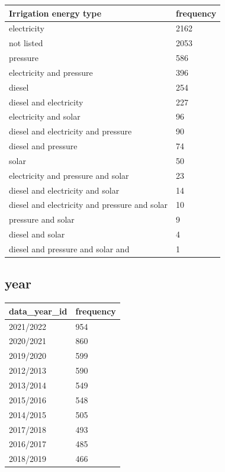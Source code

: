 \documentclass[review,12pt,authoryear]{elsarticle}
\begin{document}
\begin{linenumbers}
\begin{table}[]
  \begin{tabular}{@{}ll@{}}
  \toprule
  Irrigation energy type & frequency \\ \midrule
  electricity & 2162 \\
  not listed & 2053 \\
  pressure & 586 \\
  electricity and pressure & 396 \\
  diesel & 254 \\
  diesel and electricity & 227 \\
  electricity and solar & 96 \\
  diesel and electricity and pressure & 90 \\
  diesel and pressure & 74 \\
  solar & 50 \\
  electricity and pressure and solar & 23 \\
  diesel and electricity and solar & 14 \\
  diesel and electricity and pressure and solar & 10 \\
  pressure and solar & 9 \\
  diesel and solar & 4 \\
  diesel and pressure and solar and & 1 \\ \bottomrule
  \end{tabular}
  \end{table}


  \subsection{year}
\begin{table}[]
  \begin{tabular}{@{}ll@{}}
  \toprule
  data_year_id & frequency \\ \midrule
  2021/2022 & 954 \\
  2020/2021 & 860 \\
  2019/2020 & 599 \\
  2012/2013 & 590 \\
  2013/2014 & 549 \\
  2015/2016 & 548 \\
  2014/2015 & 505 \\
  2017/2018 & 493 \\
  2016/2017 & 485 \\
  2018/2019 & 466 \\ \bottomrule
  \end{tabular}
  \end{table}


\end{linenumbers}
\end{document}
